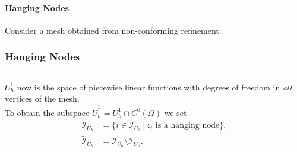 \paragraph{Hanging Nodes}

Consider a mesh obtained from non-conforming refinement.

\begin{frame}
\frametitle<presentation>{Hanging Nodes}
\begin{columns}
\begin{column}{0.6\textwidth}
$U_h^1$ now is the space of piecewise linear functions with degrees of
freedom in \textit{all} vertices of the mesh. \\
\medskip
To obtain the subspace $\tilde{U}_h^1 = U_h^1 \cap C^0(\Omega)$ we set 
\begin{align*}
\bar{\mathcal{I}}_{U_h} &= \{i\in \mathcal{I}_{U_h} \,|\, \text{$z_i$ is a
hanging node} \}, \\
\tilde{\mathcal{I}}_{U_h} &=  \mathcal{I}_{U_h}\setminus\bar{\mathcal{I}}_{U_h}.
\end{align*}
\end{column}
\end{columns}
\end{frame}
